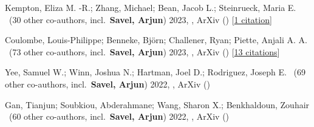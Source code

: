 \item[{\color{numcolor}\scriptsize4}] Kempton, Eliza M. -R.; Zhang, Michael; Bean, Jacob L.; Steinrueck, Maria E. \etal\ ({30} other co-authors, incl.\ \textbf{Savel, Arjun}) 2023, , ArXiv () [\href{https://ui.adsabs.harvard.edu/abs/2023arXiv230506240K}{1 citation}]

\item[{\color{numcolor}\scriptsize3}] Coulombe, Louis-Philippe; Benneke, Bj{\"o}rn; Challener, Ryan; Piette, Anjali A. A. \etal\ ({73} other co-authors, incl.\ \textbf{Savel, Arjun}) 2023, , ArXiv () [\href{https://ui.adsabs.harvard.edu/abs/2023arXiv230108192C}{13 citations}]

\item[{\color{numcolor}\scriptsize2}] Yee, Samuel W.; Winn, Joshua N.; Hartman, Joel D.; Rodriguez, Joseph E. \etal\ ({69} other co-authors, incl.\ \textbf{Savel, Arjun}) 2022, , ArXiv ()

\item[{\color{numcolor}\scriptsize1}] Gan, Tianjun; Soubkiou, Abderahmane; Wang, Sharon X.; Benkhaldoun, Zouhair \etal\ ({60} other co-authors, incl.\ \textbf{Savel, Arjun}) 2022, , ArXiv ()
